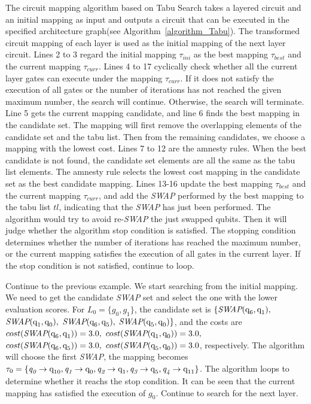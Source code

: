 \documentclass[runningheads]{llncs}
\begin{document}
	The circuit mapping algorithm based on Tabu Search takes a layered circuit and an initial mapping as input and outputs a circuit that can be executed in the specified architecture graph(see Algorithm~\ref{algorithm_Tabu}). The transformed circuit mapping of each layer is used as the initial mapping of the next layer circuit. Lines 2 to 3 regard the initial mapping $\tau_{ini}$ as the best mapping $\tau_{best}$ and the current mapping $\tau_{curr}$. Lines 4 to 17 cyclically check whether all the current layer gates can execute under the mapping $\tau_{curr}$. If it does not satisfy the execution of all gates or the number of iterations has not reached the given maximum number, the search will continue. Otherwise, the search will terminate. Line 5  gets the current mapping candidate, and line 6 finds the best mapping in the candidate set. The mapping will first remove the overlapping elements of the candidate set and the tabu list. Then from the remaining candidates, we choose a mapping with the lowest cost. Lines 7 to 12 are the amnesty rules. When the best candidate is not found, the candidate set elements are all the same as the tabu list elements. The amnesty rule selects the lowest cost mapping in the candidate set as the best candidate mapping. Lines 13-16 update the best mapping $\tau_{best}$ and the current mapping $\tau_{curr}$, and add the \textit{SWAP} performed by the best mapping to the tabu list $tl$, indicating that the \textit{SWAP} has just been performed. The algorithm would try to avoid re-\textit{SWAP} the just swapped qubits. Then it will judge whether the algorithm stop condition is satisfied. The stopping condition determines whether the number of iterations has reached the maximum number, or the current mapping satisfies the execution of all gates in the current layer. If the stop condition is not satisfied, continue to loop.
\begin{example}
Continue to the previous example. We start searching from the initial mapping. We need to get the candidate \textit{SWAP} set and select the one with the lower evaluation scores.
For $L_{0}=\{g_{0},g_{1}\}$, the candidate set is 
$\{\textit{SWAP}(\textup{q}_\textup{6},\textup{q}_\textup{1}),$ $\textit{SWAP}(\textup{q}_\textup{1},\textup{q}_\textup{0}),$ $\textit{SWAP}(\textup{q}_\textup{6},\textup{q}_\textup{5}),$ $\textit{SWAP}(\textup{q}_\textup{5},\textup{q}_\textup{0}) \}$, and the costs are
$cost(\textit{SWAP}(\textup{q}_\textup{6},\textup{q}_\textup{1}))=3.0,$ $cost(\textit{SWAP}(\textup{q}_\textup{1},\textup{q}_\textup{0}))=3.0,$\\ $cost(\textit{SWAP}(\textup{q}_\textup{6},\textup{q}_\textup{5}))=3.0,$ $cost(\textit{SWAP}(\textup{q}_\textup{5},\textup{q}_\textup{0}))=3.0$, respectively.
The algorithm will choose the first \textit{SWAP}, the mapping becomes $\tau_{0}=\{\textit{q}_\textit{0}\rightarrow  \textup{q}_\textup{10},\textit{q}_\textit{1}\rightarrow  \textup{q}_\textup{0},
\textit{q}_\textit{2}\rightarrow  \textup{q}_\textup{1},\textit{q}_\textit{3}\rightarrow  \textup{q}_\textup{5},\textit{q}_\textit{4}\rightarrow  \textup{q}_\textup{11}\}$. 
 The algorithm loops to determine whether it reachs the stop condition. It can be seen that the current mapping has satisfied the execution of $g_{0}$. Continue to search for the next layer.
\end{example}
\end{document}
